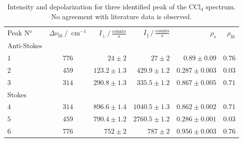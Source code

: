 \begin{table}[htpb]
    \centering
    \caption{
        Intensity and depolarization for three identified peak of the CCl$_4$ spectrum. No agreement with 
        literature data is observed.
        }
    \label{tab:ccl4_depol}
    \begin{tabular}{l c r r r r }
        \rowcolor{LightCyan} Peak N$^o$ & 
        $\Delta \nu_\text{lit} \, / \, \text{ cm}^{-1}$ & 
        $I_\perp \, / \, \frac{\text{counts}}{\text{s}}$ &
        $I_\parallel \, / \, \frac{\text{counts}}{\text{s}}$ &
        $\rho_s$  &
        $\rho_\text{lit}$\\
        \cellcolor{LightCyan}Anti-Stokes &&&&& \\
        \cellcolor{LightCyan}$1$ & $776$ & $24 \pm 2$ & $27 \pm 2$ & $0.89 \pm 0.09$ & $0.76$ \\
        \cellcolor{LightCyan}$2$ & $459$ & $123.2 \pm 1.3$ & $429.9 \pm 1.2$ & $0.287 \pm 0.003$ & $0.03$ \\
        \cellcolor{LightCyan}$3$ & $314$ & $290.8 \pm 1.3$ & $335.5 \pm 1.2$ & $0.867 \pm 0.005$ & $0.71$ \\
        \cellcolor{LightCyan}Stokes &&&&& \\
        \cellcolor{LightCyan}$4$ & $314$ & $896.6 \pm 1.4$ & $1040.5 \pm 1.3$ & $0.862 \pm 0.002$ & $0.71$ \\
        \cellcolor{LightCyan}$5$ & $459$ & $790.4 \pm 1.2$ & $2760.5 \pm 1.2$ & $0.286 \pm 0.001$ & $0.03$ \\
        \cellcolor{LightCyan}$6$ & $776$ & $752 \pm 2$ & $787 \pm 2$ & $0.956 \pm 0.003$ & $0.76$ 
    \end{tabular}
\end{table}


